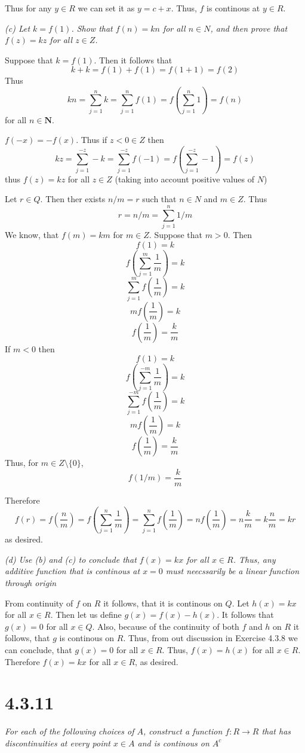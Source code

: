 \documentclass[11pt,oneside,titlepage]{book}
\begin{document}
Thus for any $y \in R$ we can set it as $y = c + x$. Thus, $f$ is continous
at $y \in R$.

\textit{(c) Let $k = f(1)$. Show that $f(n) = kn$ for all $n \in N$, and
  then prove that $f(z) = kz$ for all $z \in Z$. }

Suppose that $k = f(1)$. Then it follows that
$$k + k = f(1) + f(1) = f(1 + 1) = f(2)$$
Thus
$$kn = \sum_{j = 1}^{n} k = \sum_{j = 1}^{n} f(1) =
f\left(\sum_{j = 1}^{n} 1\right) = f(n)$$
for all $n \in \textbf{N}$.

$f(-x) = -f(x)$. Thus if $z < 0 \in Z$ then
$$kz = \sum_{j = 1}^{-z} -k = \sum_{j = 1}^{-z} f(-1) =
f\left(\sum_{j = 1}^{-z} -1\right) = f(z)$$
thus $f(z) = kz$ for all $z \in Z$ (taking into account positive values of $N$)

Let $r \in Q$. Then ther exists $n/m = r$ such that $n \in N$ and $m \in Z$.
Thus
$$r = n/m = \sum_{j = 1}^{n} 1/m$$
We know, that $f(m) = km$ for $m \in Z$. Suppose that $m > 0$. Then
$$f(1) = k$$
$$f\left(\sum_{j = 1}^m \frac{1}{m}\right) = k$$
$$\sum_{j = 1}^m f\left(\frac{1}{m}\right) = k$$
$$mf\left(\frac{1}{m}\right) = k$$
$$f\left(\frac{1}{m}\right) = \frac{k}{m}$$
If $m < 0$ then
$$f(1) = k$$
$$f\left(\sum_{j = 1}^{-m} \frac{1}{m}\right) = k$$
$$\sum_{j = 1}^{-m} f\left(\frac{1}{m}\right) = k$$
$$mf\left(\frac{1}{m}\right) = k$$
$$f\left(\frac{1}{m}\right) = \frac{k}{m}$$
Thus, for $m \in Z \setminus \{0\}$,
$$f(1/m) = \frac{k}{m}$$

Therefore
$$f(r) = f\left(\frac{n}{m}\right) = f\left(\sum_{j = 1}^n\frac{1}{m}\right) =
\sum_{j = 1}^nf\left(\frac{1}{m}\right) = n f\left(\frac{1}{m}\right) =
n \frac{k}{m} = k \frac{n}{m} = kr$$
as desired.

\textit{(d) Use (b) and (c) to conclude that $f(x) = kx$ for all $x \in R$.
  Thus, any additive function that is continous at $x = 0$ must neecssarily
  be a linear function through origin}

From continuity of $f$ on $R$ it follows, that it is continous on $Q$.
Let $h(x) = kx$ for all $x \in R$. 
Then let us define  $g(x) = f(x) - h(x)$. It follows that $g(x) = 0$ for all
$x \in Q$. Also, because of the continuity of both $f$ and $h$ on $R$ it
follows, that $g$ is continous on $R$.
Thus, from out discussion in Exercise 4.3.8 we can conclude,
that $g(x) = 0$ for all $x \in R$. Thus, $f(x) = h(x)$ for all $x \in R$.
Therefore $f(x) = kx$ for all $x \in R$, as desired.

\section*{4.3.11}
\textit{For each of the following choices of $A$, construct a function
  $f: R \to R$ that has discontinuities at every point $x \in A$ and is
  continous on $A^c$}
\end{document}
